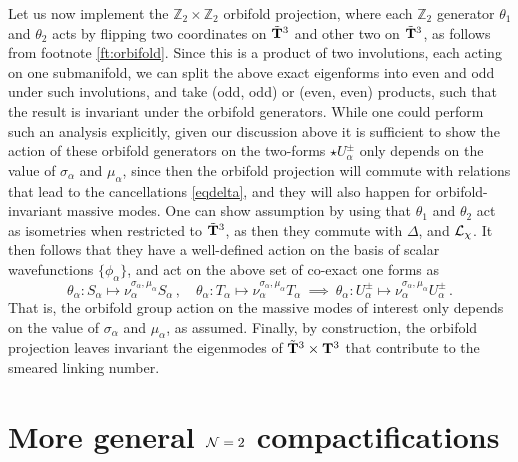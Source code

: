 \documentclass[11pt]{article}
\def\a {\alpha}
\def\CN {{\cal N}}
\def\be{\begin{equation}}
\def\ee{\end{equation}}
\def\th {{\theta}}
\newcommand{\IZ}{\mathbb{Z}}
\begin{document}
Let us now implement the $\IZ_2 \times \IZ_2$ orbifold projection, where each $\IZ_2$ generator $\th_1$ and $\th_2$ acts by flipping two coordinates on $\tilde{\bf T}^3$ and other two on $\tilde{\bf T}^3$, as follows from footnote \ref{ft:orbifold}. Since this is a product of two involutions, each acting on one submanifold, we can split the above exact eigenforms into even and odd under such involutions, and take (odd, odd) or (even, even) products, such that the result is invariant under the orbifold generators. While one could perform such an analysis explicitly, given our discussion above it is sufficient to show the action of these orbifold generators on the two-forms $\star U_\a^\pm$ only depends on the value of $\sigma_\a$ and $\mu_\a$, since then the orbifold projection will commute with relations that lead to the cancellations \eqref{eqdelta}, and they will also happen for orbifold-invariant massive modes. One can  show assumption by using that $\th_1$ and $\th_2$ act as isometries when restricted to $\tilde{\bf T}^3$, as then they commute with $\Delta$, and ${\cal L}_\chi$. It then follows that they have a well-defined action on the basis of scalar wavefunctions $\{\phi_\a\}$, and act on the above set of co-exact one forms as
\be
\th_\a : S_\a \mapsto \nu_\a^{\sigma_\a, \mu_\a} S_\a   \, , \quad \th_\a : T_\a \mapsto \nu_\a^{\sigma_\a, \mu_\a} T_\a\  \implies \ \th_\a : U_\a^\pm  \mapsto \nu_\a^{\sigma_\a, \mu_\a}  U_\a^\pm\, .
\ee
That is, the orbifold group action on the massive modes of interest only depends on the value of $\sigma_\a$ and $\mu_\a$, as assumed. Finally, by construction, the orbifold projection leaves invariant the eigenmodes of $\tilde{\bf T}^3 \times {\bf T}^3$ that contribute to the smeared linking number. 




\section{More general $\CN=2$ compactifications}
\label{s:general}
\end{document}
